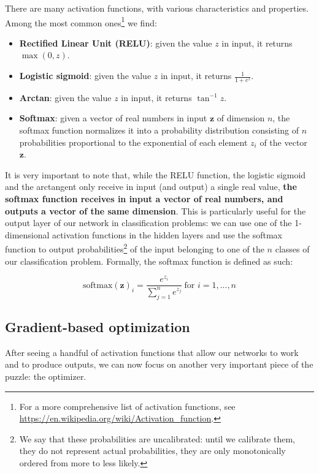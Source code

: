 There are many activation functions, with various characteristics and properties. Among the most common ones\footnote{For a more comprehensive list of activation functions, see \url{https://en.wikipedia.org/wiki/Activation_function}.} we find:

\begin{itemize}
    \item \textbf{Rectified Linear Unit (RELU)}: given the value $z$ in input, it returns $\max(0,z)$.
    \item \textbf{Logistic sigmoid}: given the value $z$ in input, it returns $\frac{1}{1+e^z}$.
    \item \textbf{Arctan}: given the value $z$ in input, it returns $\tan^{-1}z$.
    \item \textbf{Softmax}: given a vector of real numbers in input $\boldsymbol{z}$ of dimension $n$, the softmax function normalizes it into a probability distribution consisting of $n$ probabilities proportional to the exponential of each element $z_i$ of the vector $\boldsymbol{z}$.
\end{itemize}

It is very important to note that, while the RELU function, the logistic sigmoid and the arctangent only receive in input (and output) a single real value, \textbf{the softmax function receives in input a vector of real numbers, and outputs a vector of the same dimension}. This is particularly useful for the output layer of our network in classification problems: we can use one of the 1-dimensional activation functions in the hidden layers and use the softmax function to output probabilities\footnote{We say that these probabilities are uncalibrated: until we calibrate them, they do not represent actual probabilities, they are only monotonically ordered from more to less likely.} of the input belonging to one of the $n$ classes of our classification problem. Formally, the softmax function is defined as such:

\begin{equation}
    \text{softmax}(\boldsymbol{z})_i= \frac{e^{z_i}}{\sum_{j=1}^{n} e^{z_j}} \  \text{for } i = 1, ..., n
\end{equation}

\subsection{Gradient-based optimization}
After seeing a handful of activation functions that allow our networks to work and to produce outputs, we can now focus on another very important piece of the puzzle: the optimizer.

